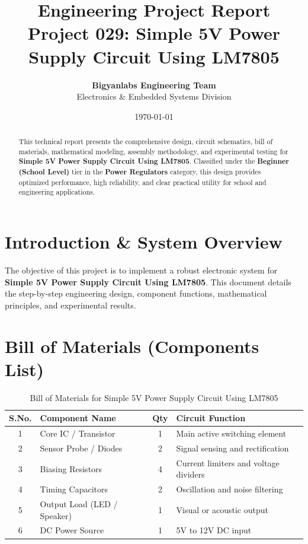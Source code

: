 \documentclass[11pt,a4paper]{article}
\title{\textbf{\Huge Engineering Project Report}\\[0.5em] \Large Project 029: Simple 5V Power Supply Circuit Using LM7805}
\author{\textbf{Bigyanlabs Engineering Team}\\ Electronics \& Embedded Systems Division}
\date{\today}
\begin{document}
\maketitle
\thispagestyle{empty}

\begin{abstract}
This technical report presents the comprehensive design, circuit schematics, bill of materials, mathematical modeling, assembly methodology, and experimental testing for \textbf{Simple 5V Power Supply Circuit Using LM7805}. Classified under the \textbf{Beginner (School Level)} tier in the \textbf{Power Regulators} category, this design provides optimized performance, high reliability, and clear practical utility for school and engineering applications.
\end{abstract}

\newpage
\tableofcontents
\newpage

\section{Introduction \& System Overview}
The objective of this project is to implement a robust electronic system for \textbf{Simple 5V Power Supply Circuit Using LM7805}. This document details the step-by-step engineering design, component functions, mathematical principles, and experimental results.

\section{Bill of Materials (Components List)}
\begin{table}[h!]
\centering
\caption{Bill of Materials for Simple 5V Power Supply Circuit Using LM7805}
\vspace{0.5em}
\begin{tabular}{clcp{7cm}}
\toprule
\textbf{S.No.} & \textbf{Component Name} & \textbf{Qty} & \textbf{Circuit Function} \\
\midrule
1 & Core IC / Transistor & 1 & Main active switching element \\
2 & Sensor Probe / Diodes & 2 & Signal sensing and rectification \\
3 & Biasing Resistors & 4 & Current limiters and voltage dividers \\
4 & Timing Capacitors & 2 & Oscillation and noise filtering \\
5 & Output Load (LED / Speaker) & 1 & Visual or acoustic output \\
6 & DC Power Source & 1 & 5V to 12V DC input \\
\bottomrule
\end{tabular}
\end{table}
\end{document}
